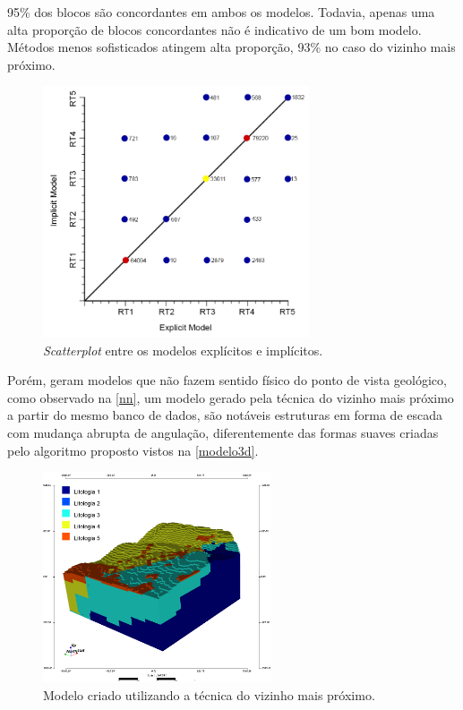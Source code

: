 95\% dos blocos são concordantes em ambos os modelos. Todavia, apenas uma alta proporção de blocos concordantes não é indicativo de um bom modelo. Métodos menos sofisticados atingem alta proporção, 93\% no caso do vizinho mais próximo.   

\begin{figure}[H]
	\caption{\label{scattermodelos}\textit{Scatterplot} entre os modelos explícitos e implícitos.}
	\begin{center}
		\includegraphics[width=0.7\textwidth]{estudo_de_caso/scatterplot_axis}
	\end{center}
\end{figure}

Porém, geram modelos que não fazem sentido físico do ponto de vista geológico, como observado na \autoref{nn}, um modelo gerado pela técnica do vizinho mais próximo a partir do mesmo banco de dados, são notáveis estruturas em forma de escada com mudança abrupta de angulação, diferentemente das formas suaves criadas pelo algoritmo proposto vistos na \autoref{modelo3d}.

\begin{figure}[H]
	\caption{\label{nn}Modelo criado utilizando a técnica do vizinho mais próximo.}
	\begin{center}
		\includegraphics[width=0.6\textwidth]{estudo_de_caso/nn}
	\end{center}
\end{figure}

